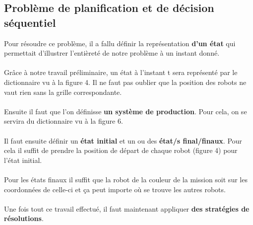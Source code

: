 \documentclass{article}
\begin{document}
\subsection{Problème de planification et de décision séquentiel}
Pour résoudre ce problème, il a fallu définir la représentation \textbf{d'un état} qui permettait d'illustrer l'entièreté de notre problème à un instant donné.\\\\ 
Grâce à notre travail préliminaire, un état à l'instant t sera représenté par le dictionnaire vu à la figure 4. Il ne faut pas oublier que la position des robots ne vaut rien sans la grille correspondante. \\\\
Ensuite il faut que l'on définisse \textbf{un système de production}. Pour cela, on se servira du dictionnaire vu à la figure 6.\\\\
Il faut ensuite définir un \textbf{état initial} et un ou des \textbf{état/s final/finaux}. Pour cela il suffit de prendre la position de départ de chaque robot (figure 4) pour l'état initial.\\\\
Pour les états finaux il suffit que la robot de la couleur de la mission soit sur les coordonnées de celle-ci et ça peut importe où se trouve les autres robots.\\\\
Une fois tout ce travail effectué, il faut maintenant appliquer \textbf{des stratégies de résolutions}.
\end{document}
